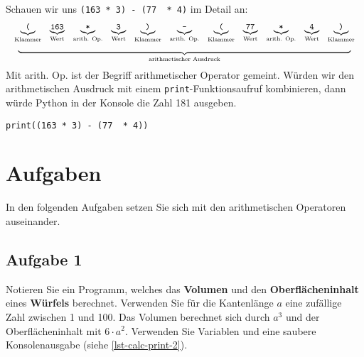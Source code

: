 \begin{example}
Schauen wir uns \lstinline{(163 * 3) - (77  * 4)} im Detail an:
$$
\begin{array}[t]{c}
\begin{array}[t]{cccccccccccc} 
\underbrace{\textrm{\texttt{(}}}_{\textrm{Klammer}} & \underbrace{\textrm{\texttt{163}}}_{\textrm{Wert}} & \underbrace{\textrm{\texttt{*}}}_{\textrm{arith. Op.}} & \underbrace{\textrm{\texttt{3}}}_{\textrm{Wert}} & \underbrace{\textrm{\texttt{)}}}_{\textrm{Klammer}} & \underbrace{\textrm{\texttt{-}}}_{\textrm{arith. Op.}} & \underbrace{\textrm{\texttt{(}}}_{\textrm{Klammer}} & \underbrace{\textrm{\texttt{77}}}_{\textrm{Wert}} & \underbrace{\textrm{\texttt{*}}}_{\textrm{arith. Op.}} & \underbrace{\textrm{\texttt{4}}}_{\textrm{Wert}} & \underbrace{\textrm{\texttt{)}}}_{\textrm{Klammer}}
\end{array} \\
\underbrace{\hspace{14cm}}_{\textrm{arithmetischer Ausdruck}}
\end{array}
$$
Mit arith. Op. ist der Begriff arithmetischer Operator gemeint. Würden wir den arithmetischen Ausdruck mit einem \lstinline{print}-Funktionsaufruf kombinieren, dann würde Python in der Konsole die Zahl \num{181} ausgeben.

\begin{lstlisting}
print((163 * 3) - (77  * 4))
\end{lstlisting}

\end{example}

\section{Aufgaben}

In den folgenden Aufgaben setzen Sie sich mit den arithmetischen Operatoren auseinander.

\subsection{Aufgabe 1}

Notieren Sie ein Programm, welches das \textbf{Volumen} und den \textbf{Oberflächeninhalt} eines \textbf{Würfels} berechnet. Verwenden Sie für die Kantenlänge $a$ eine zufällige Zahl zwischen \num{1} und \num{100}. Das Volumen berechnet sich durch $a^3$ und der Oberflächeninhalt mit $6 \cdot a^2$. Verwenden Sie Variablen und eine saubere Konsolenausgabe (siehe \autoref{lst-calc-print-2}).

